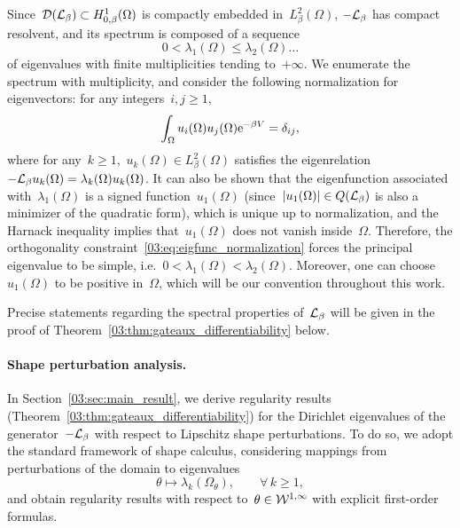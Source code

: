         Since~$\mathcal D(\mathcal{L}_\beta)\subset H_{0,\beta}^1(\Omega)$ is compactly embedded in~$L^2_\beta(\Omega)$, $-\mathcal{L}_\beta$ has compact resolvent, and its spectrum is composed of a sequence
        $$0<\lambda_1(\Omega) \leq \lambda_2(\Omega)\dots $$
        of eigenvalues with finite multiplicities tending to~$+\infty$. We enumerate the spectrum with multiplicity, and consider the following normalization for eigenvectors: for any integers~$i,j\geq 1$,
        \begin{equation}
            \label{03:eq:eigfunc_normalization}
            \int_{\Omega}u_{i}(\Omega)u_{j}(\Omega) \mathrm{e}^{-\beta V} = \delta_{ij},
        \end{equation}
        where for any~$k\geq 1$,~$u_{k}(\Omega)\in L^2_\beta(\Omega)$ satisfies the eigenrelation~$-\mathcal{L}_\beta u_k(\Omega) = \lambda_k(\Omega)u_k(\Omega)$. It can also be shown that the eigenfunction associated with~$\lambda_1(\Omega)$ is a signed function~$u_1(\Omega)$ (since~$|u_1(\Omega)|\in Q(\mathcal{L}_\beta)$ is also a minimizer of the quadratic form), which is unique up to normalization, and the Harnack inequality implies that~$u_1(\Omega)$ does not vanish inside~$\Omega$.
        Therefore, the orthogonality constraint~\eqref{03:eq:eigfunc_normalization} forces the principal eigenvalue to be simple, i.e.~$0<\lambda_1(\Omega)<\lambda_2(\Omega)$. Moreover, one can choose~$u_1(\Omega)$ to be positive in~$\Omega$, which will be our convention throughout this work.

        Precise statements regarding the spectral properties of~$\mathcal{L}_\beta$ will be given in the proof of Theorem~\ref{03:thm:gateaux_differentiability} below.


    \paragraph{Shape perturbation analysis.}
        In Section~\ref{03:sec:main_result}, we derive regularity results (Theorem~\ref{03:thm:gateaux_differentiability}) for the Dirichlet eigenvalues of the generator~$-\mathcal{L}_\beta$ with respect to Lipschitz shape perturbations.
        To do so, we adopt the standard framework of shape calculus, considering mappings from perturbations of the domain to eigenvalues
        \begin{equation}
            \theta\mapsto \lambda_k(\Omega_\theta),\qquad \forall\,k\geq 1,
        \end{equation}
        and obtain regularity results with respect to~$\theta\in{\mathcal{W}}^{1,\infty}$ with explicit first-order formulas.

